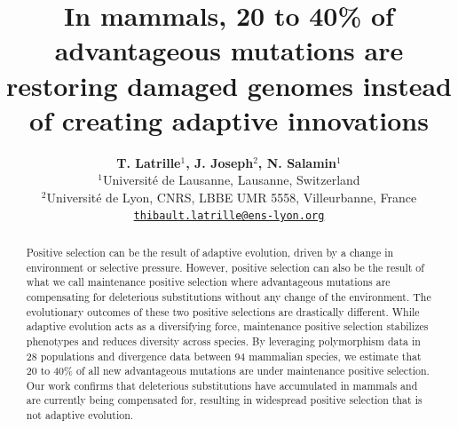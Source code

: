 \documentclass{article}
\title{In mammals, 20 to 40\% of advantageous mutations are restoring damaged genomes instead of creating adaptive innovations}
\author{
    \large
    \textbf{T. {Latrille}$^{1}$, J. {Joseph}$^{2}$, N. {Salamin}$^{1}$}\\
    \normalsize
    $^{1}$Université de Lausanne, Lausanne, Switzerland\\
    $^{2}$Université de Lyon, CNRS, LBBE UMR 5558, Villeurbanne, France \\
    \texttt{\href{mailto:thibault.latrille@ens-lyon.org}{thibault.latrille@ens-lyon.org}} \\
}
\begin{document}
    \maketitle

    \begin{abstract}
        Positive selection can be the result of adaptive evolution, driven by a change in environment or selective pressure.
        However, positive selection can also be the result of what we call maintenance positive selection where advantageous mutations are compensating for deleterious substitutions without any change of the environment.
        The evolutionary outcomes of these two positive selections are drastically different.
        While adaptive evolution acts as a diversifying force, maintenance positive selection stabilizes phenotypes and reduces diversity across species.
        By leveraging polymorphism data in 28 populations and divergence data between 94 mammalian species, we estimate that 20 to 40\% of all new advantageous mutations are under maintenance positive selection.
        Our work confirms that deleterious substitutions have accumulated in mammals and are currently being compensated for, resulting in widespread positive selection that is not adaptive evolution.
    \end{abstract}

\end{document}
